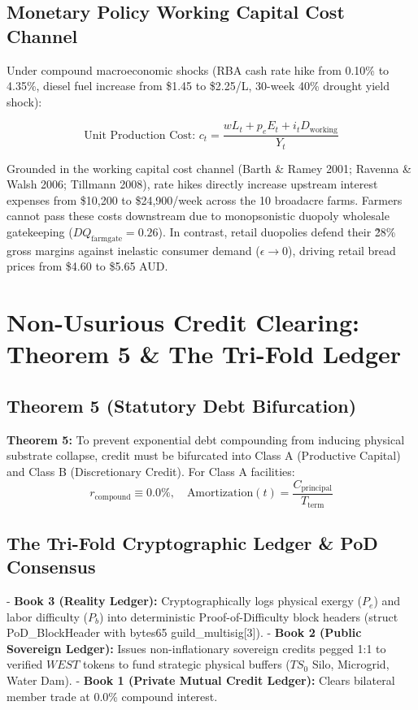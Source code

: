\documentclass[preprint,12pt,authoryear]{elsarticle}
\theoremstyle{definition}
\begin{document}
\subsection{Monetary Policy Working Capital Cost Channel}

Under compound macroeconomic shocks (RBA cash rate hike from 0.10\% to 4.35\%, diesel fuel increase from \$1.45 to \$2.25/L, 30-week 40\% drought yield shock):

  

$$\text{Unit Production Cost: } c_t = \frac{w L_t + p_e E_t + i_t D_{\text{working}}}{Y_t}$$

  

Grounded in the working capital cost channel (Barth \& Ramey 2001; Ravenna \& Walsh 2006; Tillmann 2008), rate hikes directly increase upstream interest expenses from \$10,200 to \$24,900/week across the 10 broadacre farms. Farmers cannot pass these costs downstream due to monopsonistic duopoly wholesale gatekeeping ($DQ_{\text{farmgate}} = 0.26$). In contrast, retail duopolies defend their \~28\% gross margins against inelastic consumer demand ($\epsilon \to 0$), driving retail bread prices from \$4.60 to \$5.65 AUD.

\section{Non-Usurious Credit Clearing: Theorem 5 \& The Tri-Fold Ledger}

\subsection{Theorem 5 (Statutory Debt Bifurcation)}

\textbf{Theorem 5:} To prevent exponential debt compounding from inducing physical substrate collapse, credit must be bifurcated into Class A (Productive Capital) and Class B (Discretionary Credit). For Class A facilities:  
$$r_{\text{compound}} \equiv 0.0\%, \quad \text{Amortization}(t) = \frac{C_{\text{principal}}}{T_{\text{term}}}$$

\subsection{The Tri-Fold Cryptographic Ledger \& PoD Consensus}

  - \textbf{Book 3 (Reality Ledger):} Cryptographically logs physical exergy ($P_e$) and labor difficulty ($P_b$) into deterministic Proof-of-Difficulty block headers (struct PoD\_BlockHeader with bytes65 guild\_multisig[3]).
  - \textbf{Book 2 (Public Sovereign Ledger):} Issues non-inflationary sovereign credits pegged 1:1 to verified $WEST$ tokens to fund strategic physical buffers ($TS_0$ Silo, Microgrid, Water Dam).
  - \textbf{Book 1 (Private Mutual Credit Ledger):} Clears bilateral member trade at 0.0\% compound interest.
\end{document}
